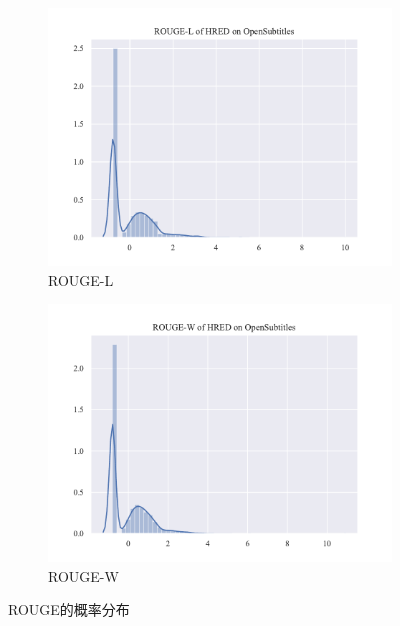 \begin{figure}[H]
\begin{subfigure}{0.4\linewidth}
        \includegraphics[width=\linewidth]{figure/distplot/opensub/hred/rouge_l/plot.pdf}
        \caption{ROUGE-L}
    \end{subfigure}%
    \begin{subfigure}{0.4\linewidth}
        \centering
        \includegraphics[width=\linewidth]{figure/distplot/opensub/hred/rouge_w/plot.pdf}
        \caption{ROUGE-W}
    \end{subfigure}
    \centering
    \caption{ROUGE的概率分布}
    \label{fig:ROUGE_dist}
\end{figure}
